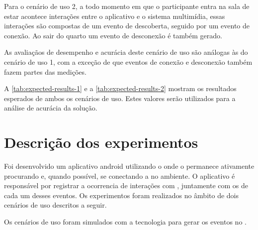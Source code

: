 Para o cenário de uso 2, a todo momento em que o participante entra na sala de estar acontece interações entre o aplicativo e o sistema multimídia, essas interações são compostas de um evento de descoberta, seguido por um evento de conexão. Ao sair do quarto um evento de desconexão é também gerado. 

As avaliaçãos de desempenho e acurácia deste cenário de uso são análogas às do cenário de uso 1, com a exceção de que eventos de conexão e desconexão também fazem partes das medições.

A \autoref{tab:expected-results-1} e a \autoref{tab:expected-results-2} mostram os resultados esperados de ambos os cenários de uso. Estes valores serão utilizados para a análise de acurácia da solução.

\begin{table}[htb]
	\begin{center}
	\end{center}
\end{table}

\section{Descrição dos experimentos}

Foi desenvolvido um aplicativo android utilizando o \mhubcddl{} onde o \smartphone{} permanece ativamente procurando e, quando possível, se conectando a \smartobjs{} no ambiente. O aplicativo é responsável por registrar a ocorrencia de interações com \smartobjs{}, juntamente com os \timestamps{} de cada um desses eventos. Os experimentos foram realizados no âmbito de dois cenários de uso descritos a seguir.

Os cenários de uso foram simulados com a tecnologia \fakesensor{} para gerar os eventos no \stwopa{}.



